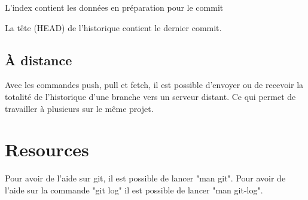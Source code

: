 \documentclass[a4paper]{article}
\begin{document}
L'index contient les données en préparation pour le commit

La tête (HEAD) de l'historique contient le dernier commit.


\subsection*{À distance}
Avec les commandes push, pull et fetch, il est possible d'envoyer ou de recevoir la totalité de l'historique d'une branche vers un serveur distant. Ce qui permet de travailler à plusieurs sur le même projet.

\vspace{2mm}


\section*{Resources}
Pour avoir de l'aide sur git, il est possible de lancer "man git". Pour
avoir de l'aide sur la commande "git log" il est possible de lancer "man
git-log".
\end{document}
